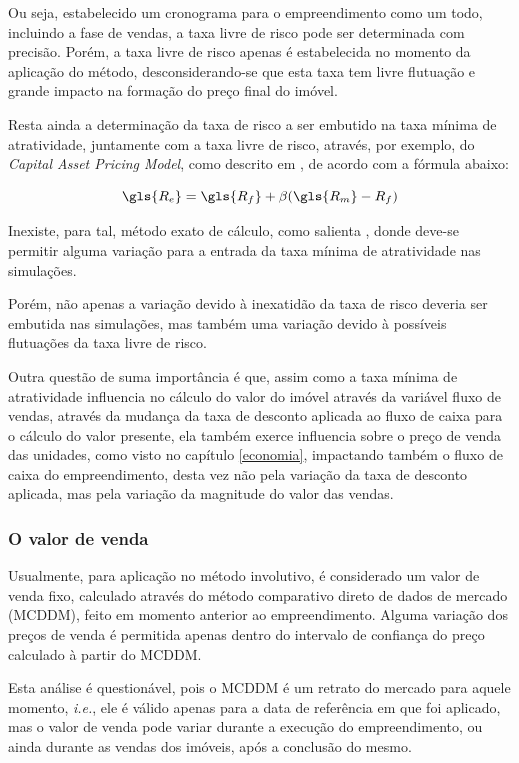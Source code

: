 \documentclass[
	12pt,				%
	oneside,			%
	a4paper,			%
	chapter=TITLE,		%
	section=TITLE,		%
	english,			%
	brazil				%
	]{abntex2}
\begin{document}
Ou seja, estabelecido um cronograma para o empreendimento como um todo,
incluindo a fase de vendas, a taxa livre de risco pode ser determinada com
precisão. Porém, a taxa livre de risco apenas é estabelecida no momento da
aplicação do método, desconsiderando-se que esta taxa tem livre flutuação e
grande impacto na formação do preço final do imóvel.

Resta ainda a determinação da taxa de risco a ser embutido na taxa mínima de
atratividade, juntamente com a taxa livre de risco, através, por exemplo, do
\emph{Capital Asset Pricing Model}, como descrito em \textcites{gahochheim}[69-73]{gahochheim},
de acordo com a fórmula abaixo:

\[\gls{R_e}= \gls{R_f} + \beta(\gls{R_m} - R_f)\]

Inexiste, para tal, método exato de cálculo, como salienta \textcite{gahochheim}, donde
deve-se permitir alguma variação para a entrada da taxa mínima de atratividade
nas simulações.

Porém, não apenas a variação devido à inexatidão da taxa de risco deveria
ser embutida nas simulações, mas também uma variação devido à possíveis
flutuações da taxa livre de risco.

Outra questão de suma importância é que, assim como a taxa mínima de
atratividade influencia no cálculo do valor do imóvel através da variável fluxo
de vendas, através da mudança da taxa de desconto aplicada ao fluxo de caixa
para o cálculo do valor presente, ela também exerce influencia sobre o preço de
venda das unidades, como visto no capítulo \ref{economia}, impactando também o
fluxo de caixa do empreendimento, desta vez não pela variação da taxa de
desconto aplicada, mas pela variação da magnitude do valor das vendas.

\hypertarget{o-valor-de-venda}{%
\subsubsection{O valor de venda}\label{o-valor-de-venda}}

Usualmente, para aplicação no método involutivo, é considerado um valor de venda
fixo, calculado através do método comparativo direto de dados de mercado
(MCDDM), feito em momento anterior ao empreendimento. Alguma variação dos preços
de venda é permitida apenas dentro do intervalo de confiança do preço calculado
à partir do MCDDM.

Esta análise é questionável, pois o MCDDM é um retrato do mercado para aquele
momento, \emph{i.e.}, ele é válido apenas para a data de referência em que foi
aplicado, mas o valor de venda pode variar durante a execução do empreendimento,
ou ainda durante as vendas dos imóveis, após a conclusão do mesmo.
\end{document}
